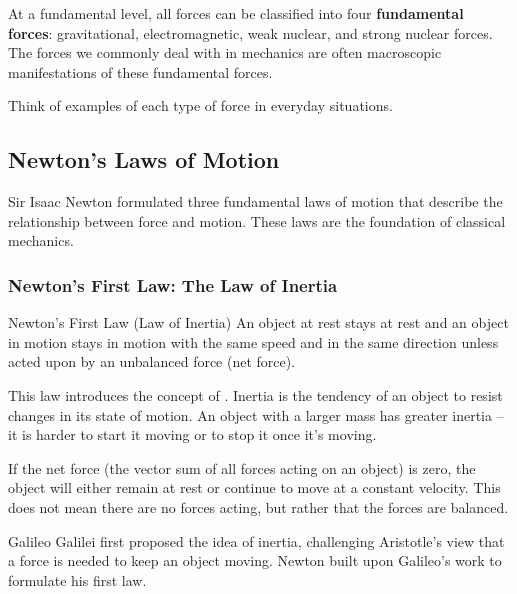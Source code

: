 \begin{marginnote}
At a fundamental level, all forces can be classified into four \textbf{fundamental forces}: gravitational, electromagnetic, weak nuclear, and strong nuclear forces.  The forces we commonly deal with in mechanics are often macroscopic manifestations of these fundamental forces.
\end{marginnote}

\begin{stopandthink}
Think of examples of each type of force in everyday situations.
\end{stopandthink}

\subsection{Newton's Laws of Motion}

Sir Isaac Newton formulated three fundamental laws of motion that describe the relationship between force and motion. These laws are the foundation of classical mechanics.

\subsubsection{Newton's First Law: The Law of Inertia}

\begin{keyconcept}{Newton's First Law (Law of Inertia)}
An object at rest stays at rest and an object in motion stays in motion with the same speed and in the same direction unless acted upon by an unbalanced force (net force).
\end{keyconcept}

This law introduces the concept of . Inertia is the tendency of an object to resist changes in its state of motion.  An object with a larger mass has greater inertia – it is harder to start it moving or to stop it once it's moving.

If the net force (the vector sum of all forces acting on an object) is zero, the object will either remain at rest or continue to move at a constant velocity.  This does not mean there are no forces acting, but rather that the forces are balanced.

\begin{marginnote}
  Galileo Galilei first proposed the idea of inertia, challenging Aristotle's view that a force is needed to keep an object moving. Newton built upon Galileo's work to formulate his first law.
\end{marginnote}

